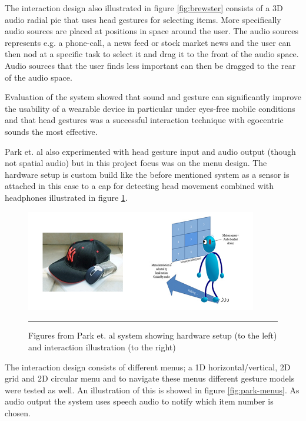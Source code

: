 The interaction design also illustrated in figure \ref{fig:brewster} consists of a 3D audio radial pie that uses head gestures for selecting items. More specifically audio sources are placed at positions in space around the user. The audio sources represents e.g. a phone-call, a news feed or stock market news and the user can then nod at a specific task to select it and drag it to the front of the audio space. Audio sources that the user finds less important can then be dragged to the rear of the audio space.

Evaluation of the system showed that sound and gesture can significantly improve the usability of a wearable device in particular under eyes-free mobile conditions and that head gestures was a successful interaction technique with egocentric sounds the most effective.


Park et. al \cite{park_gaze-directed_2011} also experimented with head gesture input and audio output (though not spatial audio) but in this project focus was on the menu design. The hardware setup is custom build like the before mentioned system as a sensor is attached in this case to a cap for detecting head movement combined with headphones illustrated in figure \ref{fig:park}.

\begin{figure}[htbp]
	\centering
		\includegraphics[width=0.9\textwidth,height=\textheight,keepaspectratio]{./Figures/park-system.png}
		\rule{35em}{0.5pt}
	\caption[Park system]{Figures from Park et. al \cite{park_gaze-directed_2011} system showing hardware setup (to the left) and interaction illustration (to the right)}
	\label{fig:park}
\end{figure}

The interaction design consists of different menus; a 1D horizontal/vertical, 2D grid and 2D circular menu and to navigate these menus different gesture models were tested as well. An illustration of this is showed in figure \ref{fig:park-menus}. As audio output the system uses speech audio to notify which item number is chosen.

